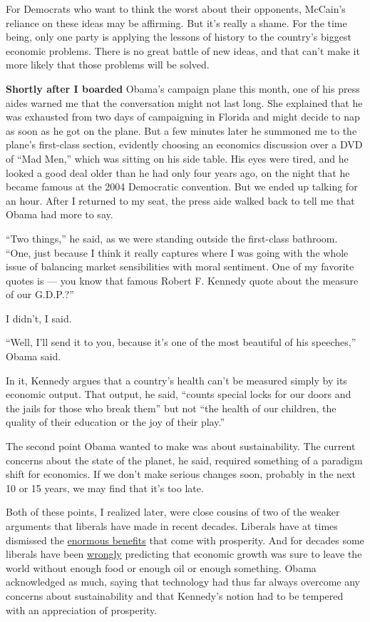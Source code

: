 For Democrats who want to think the worst about their opponents,
McCain's reliance on these ideas may be affirming. But it's really a
shame. For the time being, only one party is applying the lessons of
history to the country's biggest economic problems. There is no great
battle of new ideas, and that can't make it more likely that those
problems will be solved.

\textbf{Shortly after I boarded} Obama's campaign plane this month, one
of his press aides warned me that the conversation might not last long.
She explained that he was exhausted from two days of campaigning in
Florida and might decide to nap as soon as he got on the plane. But a
few minutes later he summoned me to the plane's first-class section,
evidently choosing an economics discussion over a DVD of ``Mad Men,''
which was sitting on his side table. His eyes were tired, and he looked
a good deal older than he had only four years ago, on the night that he
became famous at the 2004 Democratic convention. But we ended up talking
for an hour. After I returned to my seat, the press aide walked back to
tell me that Obama had more to say.

``Two things,'' he said, as we were standing outside the first-class
bathroom. ``One, just because I think it really captures where I was
going with the whole issue of balancing market sensibilities with moral
sentiment. One of my favorite quotes is --- you know that famous Robert
F. Kennedy quote about the measure of our G.D.P.?''

I didn't, I said.

``Well, I'll send it to you, because it's one of the most beautiful of
his speeches,'' Obama said.

In it, Kennedy argues that a country's health can't be measured simply
by its economic output. That output, he said, ``counts special locks for
our doors and the jails for those who break them'' but not ``the health
of our children, the quality of their education or the joy of their
play.''

The second point Obama wanted to make was about sustainability. The
current concerns about the state of the planet, he said, required
something of a paradigm shift for economics. If we don't make serious
changes soon, probably in the next 10 or 15 years, we may find that it's
too late.

Both of these points, I realized later, were close cousins of two of the
weaker arguments that liberals have made in recent decades. Liberals
have at times dismissed the
\href{http://www.nytimes.com/2008/04/16/business/16leonhardt.html}{enormous
benefits} that come with prosperity. And for decades some liberals have
been
\href{http://www.nytimes.com/1990/12/02/magazine/120290-tierney-magazine.html}{wrongly}
predicting that economic growth was sure to leave the world without
enough food or enough oil or enough something. Obama acknowledged as
much, saying that technology had thus far always overcome any concerns
about sustainability and that Kennedy's notion had to be tempered with
an appreciation of prosperity.


